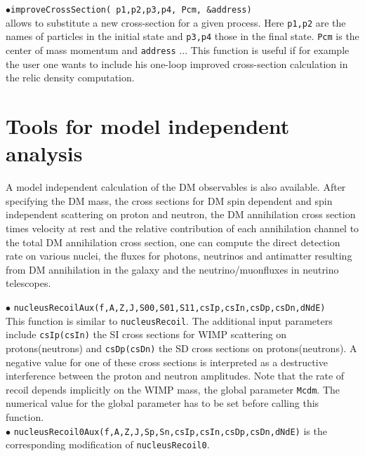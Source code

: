 \documentclass[12pt,a4paper]{article}
\begin{document}
\noindent$\bullet$\verb|improveCrossSection( p1,p2,p3,p4, Pcm, &address)|\\
allows to substitute a new cross-section for a given process. Here \verb|p1,p2| are the names of particles in the initial state and \verb|p3,p4| those in the final state. \verb|Pcm| is the center of mass momentum and \verb|address| ... This function is useful if for example the user one wants to include his one-loop improved cross-section calculation in the relic density computation.


\section{Tools for model independent analysis}

A model independent calculation of the DM observables is also available.
After specifying the DM mass, the cross sections for DM  spin dependent and  spin independent scattering on proton and neutron, the DM annihilation cross section times velocity at rest and the relative contribution of  each annihilation channel to the total DM annihilation cross section, one can compute the direct detection rate on   various nuclei, the fluxes for photons, neutrinos and antimatter resulting from DM annihilation in the galaxy and the neutrino/muonfluxes in neutrino telescopes.  

\noindent
$\bullet$ \verb|nucleusRecoilAux(f,A,Z,J,S00,S01,S11,csIp,csIn,csDp,csDn,dNdE)|\\
This function is similar to \verb|nucleusRecoil|. 
The additional input parameters include \verb|csIp(csIn)| the SI cross 
sections for WIMP scattering on protons(neutrons) and
\verb|csDp(csDn)| the SD cross sections on protons(neutrons). 
A negative value for one of these cross sections is interpreted as a destructive 
interference between the
proton and neutron amplitudes. Note that the rate of recoil  depends 
implicitly on the WIMP mass, the  global parameter \verb|Mcdm|.
 The numerical value for the global parameter has to be
set before calling this function.\\
\noindent
$\bullet$ \verb|nucleusRecoil0Aux(f,A,Z,J,Sp,Sn,csIp,csIn,csDp,csDn,dNdE)|
is the corresponding modification of \verb|nucleusRecoil0|.\\
\end{document}
